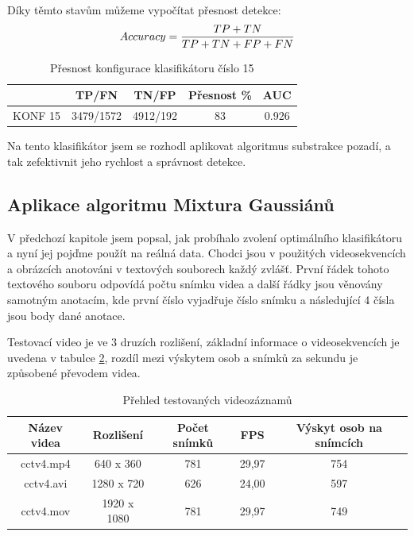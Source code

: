 Díky těmto stavům můžeme vypočítat přesnost detekce:
\begin{equation*}
\centering
 \label{eq:accuracy}
 \begin{aligned}
Accuracy = \frac{TP + TN}{TP + TN + FP + FN}
 \end{aligned}
\end{equation*}

\begin{table}[H]
\centering
\caption{Přesnost konfigurace klasifikátoru číslo 15}
\begin{tabular} { |c|c|c|c|c| }
\hline
{}          & {TP/FN} 	 & {TN/FP} 	& {Přesnost \%} & {AUC}  \\ \hline
KONF 15 	&  3479/1572 & 4912/192 &     83 		& 0.926  \\ \hline
\end{tabular}
\label{classTab2}
\end{table}
Na tento klasifikátor jsem se rozhodl aplikovat algoritmus substrakce pozadí, a tak zefektivnit jeho rychlost a správnost detekce.

\subsection{Aplikace algoritmu Mixtura Gaussiánů}
V předchozí kapitole jsem popsal, jak probíhalo zvolení optimálního klasifikátoru a nyní jej pojďme použít na reálná data. Chodci jsou v použitých videosekvencích a obrázcích anotováni v textových souborech každý zvlášť. První řádek tohoto textového souboru odpovídá počtu snímku videa a další řádky jsou věnovány samotným anotacím, kde první číslo vyjadřuje číslo snímku a následující 4 čísla jsou body dané anotace.

Testovací video je ve 3 druzích rozlišení, základní informace o videosekvencích je uvedena v tabulce \ref{videosTab}, rozdíl mezi výskytem osob a snímků za sekundu je způsobené převodem videa.

\begin{table}[H]
\centering
\caption{Přehled testovaných videozáznamů}
\begin{tabular} { |c|c|c|c|c| }
\hline
{Název videa}   & {Rozlišení} 	& {Počet snímků}    & {FPS} & {Výskyt osob na snímcích}  	\\ \hline
cctv4.mp4 		&  640 x  360	& 781  				& 29,97	& 	754							\\ \hline
cctv4.avi		& 1280 x  720	& 626  				& 24,00	& 	597							\\ \hline
cctv4.mov 		& 1920 x 1080	& 781  				& 29,97	& 	749							\\ \hline
\end{tabular}
\label{videosTab}
\end{table}

